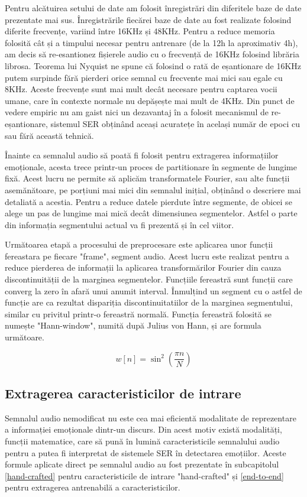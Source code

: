 \documentclass[a4paper,12pt]{book}
\begin{document}
					Pentru alcătuirea setului de date am folosit înregistrări din diferitele baze de date prezentate mai sus. Înregistrările fiecărei baze de date au fost realizate folosind diferite frecvențe, variind între 16KHz și 48KHz. Pentru a reduce memoria folosită cât și a  timpului necesar pentru antrenare (de la 12h la aproximativ 4h), am decis să re-esantionez fișierele audio cu o frecvență de 16KHz folosind librăria librosa. Teorema lui Nyquist ne spune că folosind o rată de eșantionare de 16KHz putem surpinde fără pierderi orice semnal cu frecvente mai mici sau egale cu 8KHz. Aceste frecvențe sunt mai mult decât necesare pentru captarea vocii umane, care în contexte normale nu depășește mai mult de 4KHz. Din punct de vedere empiric nu am gaist nici un dezavantaj în a folosit mecanismul de re-eșantionare, sistemul SER obținând aceași acuratețe în același număr de epoci cu sau fără această tehnică. \par
					
					Înainte ca semnalul audio să poată fi folosit pentru extragerea informațiilor emoționale, acesta trece printr-un proces de partitionare în segmente de lungime fixă. Acest lucru ne permite să aplicăm transformatele Fourier, sau alte funcții asemănătoare, pe porțiuni mai mici din semnalul inițial, obținând o descriere mai detaliată a acestia. Pentru a reduce datele pierdute între segmente, de obicei se alege un pas de lungime mai mică decât dimensiunea segmentelor. Astfel o parte din informația segmentului actual va fi prezentă și în cel viitor. \par 
					Următoarea etapă a procesului de preprocesare este aplicarea unor funcții fereastara pe fiecare "frame", segment audio. Acest lucru este realizat pentru a reduce pierderea de informații la aplicarea transformărilor Fourier din cauza discontinuității de la marginea segmentelor. Funcțiile fereastră sunt funcții care converg la zero în afară unui anumit interval. Înmulțind un segment cu o astfel de funcție are ca rezultat dispariția discontinuitatiilor de la marginea segmentului, similar cu privitul printr-o fereastră normală. Funcția fereastră folosită se numește "Hann-window", numită după Julius von Hann, și are formula următoare. \par
					\begin{equation}
					w[n]=\sin^2(\frac{\pi n}{N})
					\end{equation}
					
				\subsection{Extragerea caracteristicilor de intrare} \label{fex}
				Semnalul audio nemodificat nu este cea mai eficientă modalitate de reprezentare a informației emoționale dintr-un discurs. Din acest motiv există modalități, funcții matematice, care să pună în lumină caracteristicile semnalului audio pentru a putea fi interpretat de sistemele SER în detectarea emoțiilor. Aceste formule aplicate direct pe semnalul audio au fost prezentate în subcapitolul \ref{hand-crafted} pentru caracteristicile de intrare "hand-crafted" și \ref{end-to-end} pentru extragerea antrenabilă a caracteristicilor. \par
				
\end{document}
